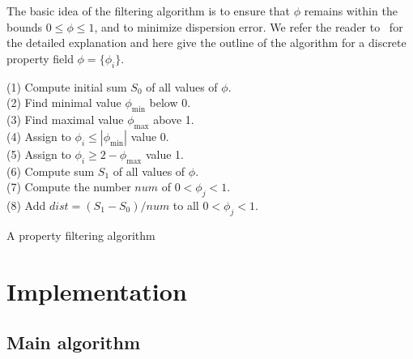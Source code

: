 The basic idea of the filtering algorithm is to ensure that $\phi$
remains within the bounds $0 \leqslant \phi \leqslant 1$, and to minimize
dispersion error.  We refer the reader to~\citet{LenardicKaula1993}
for the detailed explanation and here give the outline of the algorithm
for a discrete property field $\phi = \{\phi_i \}$.
\begin{algorithm}
  \begin{tabbing}
  (1) Compute initial sum $S_0$ of all values of $\phi$. \\
  (2) Find minimal value $\phi_{\min}$ below 0. \\
  (3) Find maximal value $\phi_{\max}$ above 1. \\
  (4) Assign to $\phi_i \leqslant | \phi_{\min} |$ value 0. \\
  (5) Assign to $\phi_i \geqslant 2 - \phi_{\max} $ value 1. \\
  (6) Compute sum $S_1$ of all values of $\phi$. \\
  (7) Compute the number $num$ of $0 < \phi_j < 1$. \\
  (8) Add $dist = (S_1 - S_0)/num$ to all $ 0 < \phi_j < 1$.
  \end{tabbing}
  \caption{A property filtering algorithm}
  \label{vynnytska:alg:filtering}
\end{algorithm}


\section{Implementation}

\subsection{Main algorithm}

